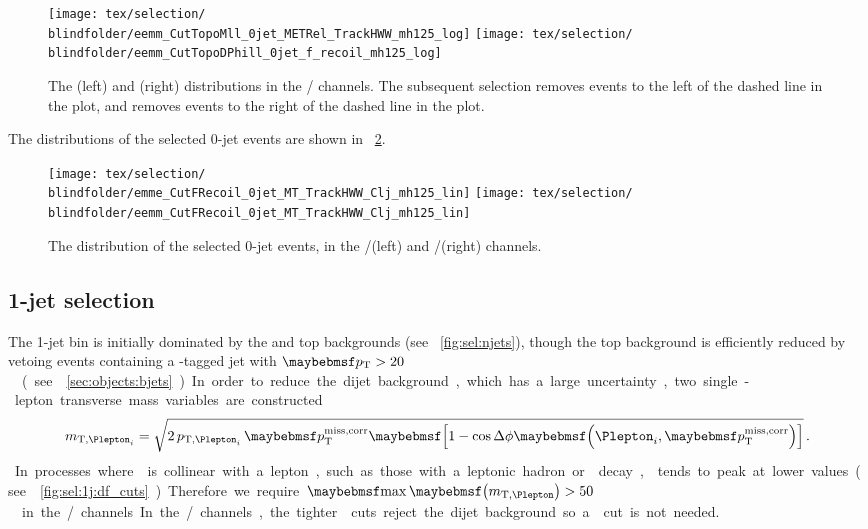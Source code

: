 \begin{figure}
	\texttt{[image: tex/selection/\\blindfolder/eemm\_CutTopoMll\_0jet\_METRel\_TrackHWW\_mh125\_log]}
	\hfill
	\texttt{[image: tex/selection/\\blindfolder/eemm\_CutTopoDPhill\_0jet\_f\_recoil\_mh125\_log]}
	\caption{The \trackmetrel (left) and \frecoil (right) distributions in the \eech/\mmch 
	channels. The subsequent selection removes events to the left of the dashed line in the 
	\trackmetrel plot, and removes events to the right of the dashed line in the \frecoil 
	plot.}
	\label{fig:sel:0j:sf_cuts}
\end{figure}

The \mt distributions of the selected 0-jet events are shown in \Figure~\ref{fig:sel:0j:mt}.

\begin{figure}
	\texttt{[image: tex/selection/\\blindfolder/emme\_CutFRecoil\_0jet\_MT\_TrackHWW\_Clj\_mh125\_lin]}
	\hfill
	\texttt{[image: tex/selection/\\blindfolder/eemm\_CutFRecoil\_0jet\_MT\_TrackHWW\_Clj\_mh125\_lin]}
	\caption{The \mt distribution of the selected 0-jet events, in the \emch/\mech (left) 
	and \eech/\mmch (right) channels.}
	\label{fig:sel:0j:mt}
\end{figure}



\subsection{1-jet selection}
\label{sec:selection:1j}

The 1-jet bin is initially dominated by the \DY and top backgrounds (see 
\Figure~\ref{fig:sel:njets}), though the top background is efficiently reduced by vetoing 
events containing a \Pbottom-tagged jet with \unit{$\pt > 20$}{\GeV} (see 
\Section~\ref{sec:objects:bjets}).

In order to reduce the dijet background, which has a large uncertainty, two single-lepton 
transverse mass variables are constructed
\begin{equation}
	m_{\text{T,}\Plepton_i} = \sqrt{2 \, p_{\text{T,}\Plepton_i} \, \corrtrackmet 
	\sqbracs{1 - \cos\Delta\phi\parenths{\Plepton_i, \corrtrackmet}}} \,.
\end{equation}
In processes where \corrtrackmetvec is collinear with a lepton, such as those with a 
leptonic hadron or \Ptau decay, \maxmtw tends to peak at lower values (see 
\Figure~\ref{fig:sel:1j:df_cuts}). Therefore we require \unit{$\maxmtw > 50$}{\GeV} in the 
\emch/\mech channels. In the \eech/\mmch channels, the tighter \met cuts reject the dijet 
background so a \maxmtw cut is not needed.

